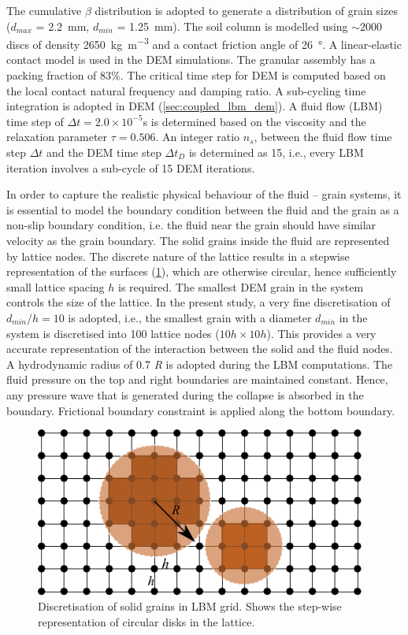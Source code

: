The cumulative $\beta$ distribution is adopted to generate a distribution of 
grain sizes ($d_{max}$ = \SI{2.2}{\milli\meter}, $d_{min}$ = 
\SI{1.25}{\milli\meter}). The soil column is modelled using $\sim 2000$ discs 
of density \SI{2650}{\kg\per\cubic\meter} and a contact friction angle of 
\SI{26}{\degree}. A linear-elastic contact model is used in the
DEM simulations. The granular assembly has a packing fraction of $83\%$. The 
critical time step for DEM is computed based on the local 
contact natural frequency and damping ratio. A sub-cycling time integration is 
adopted in DEM (\cref{sec:coupled_lbm_dem}). A fluid flow (LBM) time step 
of $\Delta t = 2.0\times 10^{-5}$\si{\s} is determined based on the viscosity 
and the relaxation parameter $\tau = 0.506$. An integer ratio $n_s$, between 
the fluid flow time step $\Delta t$ and the DEM time step $\Delta t_D$ is 
determined as 15, i.e., every LBM iteration involves a sub-cycle of 15 DEM 
iterations.

In order to capture the realistic physical behaviour of the fluid – grain 
systems, it is essential to model the boundary condition between the fluid and 
the grain as a non-slip boundary condition, i.e. the fluid near the grain 
should have similar velocity as the grain boundary. The solid grains inside the 
fluid are represented by lattice nodes. The discrete nature of the lattice 
results in a stepwise representation of the surfaces (\cref{fig:LBM-DEM}), 
which are otherwise circular, hence sufficiently small lattice spacing $h$ is 
required. The smallest DEM grain in the system controls the size of the 
lattice. In the present study, a very fine discretisation of $d_{min}/h = 10$ 
is adopted, i.e., the smallest grain with a diameter $d_{min}$ in the system is 
discretised into 100 lattice nodes ($ 10h \times 10h$). This provides a very 
accurate representation of the interaction between the solid and the fluid 
nodes.  A hydrodynamic radius of 0.7 \textit{R} is adopted during the LBM 
computations. 
The fluid pressure on the top and right boundaries are maintained constant. 
Hence, any pressure wave that is generated during the collapse is absorbed in 
the boundary. Frictional boundary constraint is applied along the bottom 
boundary.

\begin{figure}[htpb]
\centering
\includegraphics[width=0.97\textwidth]{LBM-DEM}
\caption{Discretisation of solid grains in LBM grid. Shows the step-wise 
representation of circular disks in the lattice.}
\label{fig:LBM-DEM}
\end{figure}


